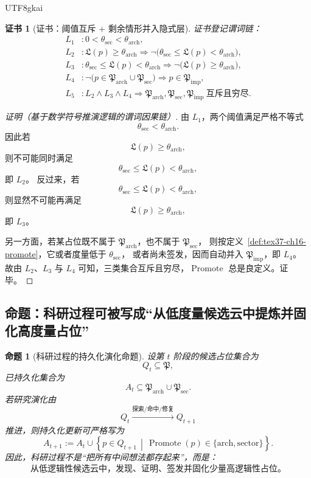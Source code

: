 \documentclass[12pt]{article}
\newtheorem{proposition}{命题}[section]
\newtheorem{Certificate}{证书}[section]
\newcommand{\Promote}{\operatorname{Promote}}
\begin{document}
\begin{CJK*}{UTF8}{gkai}
\begin{Certificate}[证书：阈值互斥 + 剩余情形并入隐式层]
\label{cert:tex37-ch16-trichotomy}
证书登记谓词链：
\[
\begin{aligned}
  L_1 &: 0<\theta_{\mathrm{sec}}<\theta_{\mathrm{arch}},\\
  L_2 &: \mathfrak L(p)\ge \theta_{\mathrm{arch}}
  \Rightarrow
  \neg\bigl(\theta_{\mathrm{sec}}\le \mathfrak L(p)<\theta_{\mathrm{arch}}\bigr),\\
  L_3 &: \theta_{\mathrm{sec}}\le \mathfrak L(p)<\theta_{\mathrm{arch}}
  \Rightarrow
  \neg\bigl(\mathfrak L(p)\ge \theta_{\mathrm{arch}}\bigr),\\
  L_4 &: \neg\bigl(p\in\mathfrak P_{\mathrm{arch}}\cup\mathfrak P_{\mathrm{sec}}\bigr)
  \Rightarrow
  p\in\mathfrak P_{\mathrm{imp}},\\
  L_5 &: L_2\wedge L_3\wedge L_4
  \Rightarrow
  \mathfrak P_{\mathrm{arch}},\mathfrak P_{\mathrm{sec}},\mathfrak P_{\mathrm{imp}}\ \text{互斥且穷尽}.
\end{aligned}
\]
\end{Certificate}

\begin{proof}[证明（基于数学符号推演逻辑的谓词因果链）]
由 $L_1$，两个阈值满足严格不等式
\[
  \theta_{\mathrm{sec}}<\theta_{\mathrm{arch}}.
\]
因此若
\[
  \mathfrak L(p)\ge \theta_{\mathrm{arch}},
\]
则不可能同时满足
\[
  \theta_{\mathrm{sec}}\le \mathfrak L(p)<\theta_{\mathrm{arch}},
\]
即 $L_2$。
反过来，若
\[
  \theta_{\mathrm{sec}}\le \mathfrak L(p)<\theta_{\mathrm{arch}},
\]
则显然不可能再满足
\[
  \mathfrak L(p)\ge \theta_{\mathrm{arch}},
\]
即 $L_3$。

另一方面，若某占位既不属于 $\mathfrak P_{\mathrm{arch}}$，也不属于 $\mathfrak P_{\mathrm{sec}}$，
则按定义~\ref{def:tex37-ch16-promote}，它或者度量低于 $\theta_{\mathrm{sec}}$，
或者尚未签发，因而自动并入 $\mathfrak P_{\mathrm{imp}}$，即 $L_4$。
故由 $L_2$、$L_3$ 与 $L_4$ 可知，三类集合互斥且穷尽，$\Promote$ 总是良定义。证毕。
\end{proof}

\subsection{命题：科研过程可被写成“从低度量候选云中提炼并固化高度量占位”}
\label{subsec:tex37-ch16-proposition}

\begin{proposition}[科研过程的持久化演化命题]
\label{prop:tex37-ch16-research}
设第 $t$ 阶段的候选占位集合为
\[
  Q_t\subseteq \mathfrak P,
\]
已持久化集合为
\[
  A_t\subseteq \mathfrak P_{\mathrm{arch}}\cup\mathfrak P_{\mathrm{sec}}.
\]
若研究演化由
\[
  Q_t
  \xrightarrow{\text{探索/命中/修复}}
  Q_{t+1}
\]
推进，则持久化更新可严格写为
\[
  A_{t+1}
  :=
  A_t
  \cup
  \left\{
    p\in Q_{t+1}
    \,\middle|\,
    \Promote(p)\in\{\mathrm{arch},\mathrm{sector}\}
  \right\}.
\]
因此，科研过程不是“把所有中间想法都存起来”，而是：
\[
  \boxed{
    \text{从低逻辑性候选云中，发现、证明、签发并固化少量高逻辑性占位。}
  }
\]
\end{proposition}


\end{CJK*}
\end{document}
